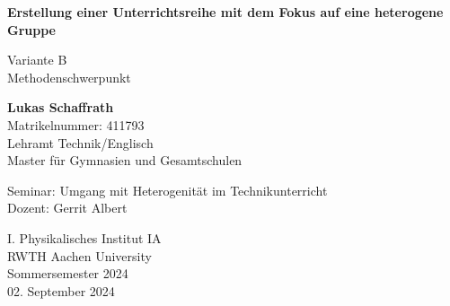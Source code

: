\documentclass[12pt]{article}
\begin{document}
\begin{titlepage}
    \begin{center}
        \vspace*{0.5cm}
            
        \LARGE
        \textbf{Erstellung einer Unterrichtsreihe mit dem Fokus auf eine heterogene Gruppe}
            
        \vspace{0.2cm}
        \Large
        Variante B\\
        Methodenschwerpunkt
            
        \vspace{2cm}
            
        \textbf{Lukas Schaffrath}\\
        Matrikelnummer: 411793\\
        Lehramt Technik/Englisch\\
        Master für Gymnasien und Gesamtschulen
            
        \vspace{2cm}
            
        Seminar: Umgang mit Heterogenität im Technikunterricht\\
        Dozent: Gerrit Albert
            
        \vspace{2cm}
            
            
        \Large
        I. Physikalisches Institut IA\\
        RWTH Aachen University\\
        Sommersemester 2024\\
        02. September 2024
            
    \end{center}
\end{titlepage}

\tableofcontents

\newpage
\thispagestyle{empty}
\listoffigures
\vspace{0.5cm}
\listoftables


\newpage
\setcounter{page}{1}
\pagestyle{maintext}

\end{document}
